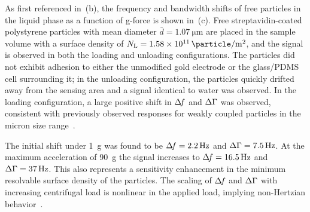 As first referenced in \,(b), the frequency and bandwidth
shifts of free particles in the liquid phase as a function of g-force is shown
in \,(c).  Free streptavidin-coated polystyrene particles
with mean diameter $\bar{d}=\SI{1.07}{\micro\meter}$ are placed in the sample
volume with a surface density of
$N_\mathrm{L}=\SI{1.58e11}{\particle\per\meter\squared}$, and the signal is
observed in both the loading and unloading configurations.  The particles did
not exhibit adhesion to either the unmodified gold electrode or the glass/PDMS
cell surrounding it; in the unloading configuration, the particles quickly
drifted away from the sensing area and a signal identical to water was
observed.  In the loading configuration, a large positive shift in $\Delta\!f$ and
$\Delta\Gamma$ was observed, consistent with previously observed responses for weakly
coupled particles in the micron size range~\cite{johannsman2007contacts}.


The initial shift under \SI{1}{g} was found to be $\Delta\!f= \SI{2.2}{\hertz}$ and
$\Delta\Gamma=\SI{7.5}{\hertz}$.  At the maximum acceleration of \SI{90}{g} the signal
increases to $\Delta\!f = \SI{16.5}{\hertz}$ and $\Delta\Gamma=\SI{37}{\hertz}$.  This also
represents a sensitivity enhancement in the minimum resolvable surface density
of the particles.  The scaling of $\Delta\!f$ and $\Delta\Gamma$ with increasing centrifugal
load is nonlinear in the applied load, implying non-Hertzian
behavior~\cite{borovsky2001measuring}.

